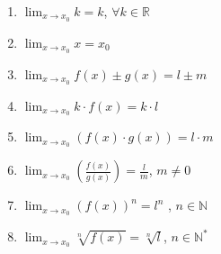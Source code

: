 \begin{enumerate}
	\item $ \lim_{x\to x_{0}} k = k $, $ \forall k \in \mathbb{R} $
	\item $ \lim_{x\to x_{0}} x = x_{0} $
	\item $ \lim_{x\to x_{0}} f(x) \pm g(x) = l \pm m $
	\item $ \lim_{x\to x_{0}} k \cdot f(x) = k\cdot l $
	\item $ \lim_{x\to x_{0}} (f(x) \cdot g(x)) = l\cdot m $
	\item $ \lim_{x\to x_{0}} \left(\frac{f(x)}{g(x)}\right) = \frac{l}{m} $, $ m\neq 0 $
	\item $ \lim_{x\to x_{0}} (f(x))^{n} = l^{n} $ , $ n\in \mathbb{N} $ 
	\item $ \lim_{x\to x_{0}} \sqrt[n]{f(x)} = \sqrt[n]{l} $, $ n \in \mathbb{N^{*}} $
\end{enumerate}

	


